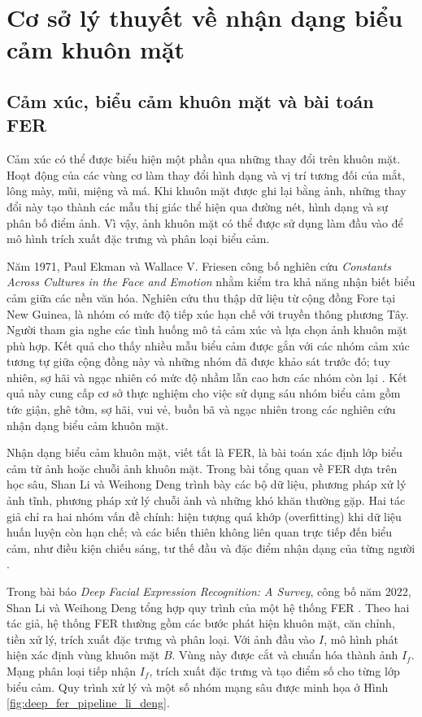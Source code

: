 \documentclass[../LuanVan.tex]{subfiles}
\begin{document}
\section{Cơ sở lý thuyết về nhận dạng biểu cảm khuôn mặt}
\label{section:fer_theory}

\subsection{Cảm xúc, biểu cảm khuôn mặt và bài toán FER}
\label{subsection:emotion_and_fer}

Cảm xúc có thể được biểu hiện một phần qua những thay đổi trên khuôn mặt. Hoạt động của các vùng cơ làm thay đổi hình dạng và vị trí tương đối của mắt, lông mày, mũi, miệng và má. Khi khuôn mặt được ghi lại bằng ảnh, những thay đổi này tạo thành các mẫu thị giác thể hiện qua đường nét, hình dạng và sự phân bố điểm ảnh. Vì vậy, ảnh khuôn mặt có thể được sử dụng làm đầu vào để mô hình trích xuất đặc trưng và phân loại biểu cảm.

Năm 1971, Paul Ekman và Wallace V. Friesen công bố nghiên cứu \textit{Constants Across Cultures in the Face and Emotion} nhằm kiểm tra khả năng nhận biết biểu cảm giữa các nền văn hóa. Nghiên cứu thu thập dữ liệu từ cộng đồng Fore tại New Guinea, là nhóm có mức độ tiếp xúc hạn chế với truyền thông phương Tây. Người tham gia nghe các tình huống mô tả cảm xúc và lựa chọn ảnh khuôn mặt phù hợp. Kết quả cho thấy nhiều mẫu biểu cảm được gắn với các nhóm cảm xúc tương tự giữa cộng đồng này và những nhóm đã được khảo sát trước đó; tuy nhiên, sợ hãi và ngạc nhiên có mức độ nhầm lẫn cao hơn các nhóm còn lại \cite{ekman1971constants}. Kết quả này cung cấp cơ sở thực nghiệm cho việc sử dụng sáu nhóm biểu cảm gồm tức giận, ghê tởm, sợ hãi, vui vẻ, buồn bã và ngạc nhiên trong các nghiên cứu nhận dạng biểu cảm khuôn mặt.

Nhận dạng biểu cảm khuôn mặt, viết tắt là FER, là bài toán xác định lớp biểu cảm từ ảnh hoặc chuỗi ảnh khuôn mặt. Trong bài tổng quan về FER dựa trên học sâu, Shan Li và Weihong Deng trình bày các bộ dữ liệu, phương pháp xử lý ảnh tĩnh, phương pháp xử lý chuỗi ảnh và những khó khăn thường gặp. Hai tác giả chỉ ra hai nhóm vấn đề chính: hiện tượng quá khớp (overfitting) khi dữ liệu huấn luyện còn hạn chế; và các biến thiên không liên quan trực tiếp đến biểu cảm, như điều kiện chiếu sáng, tư thế đầu và đặc điểm nhận dạng của từng người \cite{li2022deepfer}.

Trong bài báo \textit{Deep Facial Expression Recognition: A Survey}, công bố năm 2022, Shan Li và Weihong Deng tổng hợp quy trình của một hệ thống FER \cite{li2022deepfer}. Theo hai tác giả, hệ thống FER thường gồm các bước phát hiện khuôn mặt, căn chỉnh, tiền xử lý, trích xuất đặc trưng và phân loại. Với ảnh đầu vào $I$, mô hình phát hiện xác định vùng khuôn mặt $B$. Vùng này được cắt và chuẩn hóa thành ảnh $I_f$. Mạng phân loại tiếp nhận $I_f$, trích xuất đặc trưng và tạo điểm số cho từng lớp biểu cảm. Quy trình xử lý và một số nhóm mạng sâu được minh họa ở Hình \ref{fig:deep_fer_pipeline_li_deng}.
\end{document}
